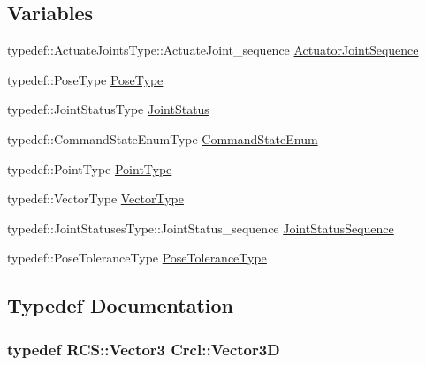 \subsection*{Variables}
\begin{DoxyCompactItemize}
\item 
typedef\-::\-Actuate\-Joints\-Type\-::\-Actuate\-Joint\-\_\-sequence \hyperlink{namespaceCrcl_af084766e8e2d38a135cc67ef54d9904d}{Actuator\-Joint\-Sequence}
\item 
typedef\-::\-Pose\-Type \hyperlink{namespaceCrcl_acc6c82b52280f4d0e74b82a92400956e}{Pose\-Type}
\item 
typedef\-::\-Joint\-Status\-Type \hyperlink{namespaceCrcl_a687707df3e92b0a1821bec2a0194039f}{Joint\-Status}
\item 
typedef\-::\-Command\-State\-Enum\-Type \hyperlink{namespaceCrcl_a5b3aa14f2f4ed63cc67ecba8eaab5c93}{Command\-State\-Enum}
\item 
typedef\-::\-Point\-Type \hyperlink{namespaceCrcl_a04f09d617642257f5938e52cee2feeef}{Point\-Type}
\item 
typedef\-::\-Vector\-Type \hyperlink{namespaceCrcl_ae868d4ece511d1485ed5d9118395aef8}{Vector\-Type}
\item 
typedef\-::\-Joint\-Statuses\-Type\-::\-Joint\-Status\-\_\-sequence \hyperlink{namespaceCrcl_a8e2d423195eeffb85b45b63f595f2825}{Joint\-Status\-Sequence}
\item 
typedef\-::\-Pose\-Tolerance\-Type \hyperlink{namespaceCrcl_ac805071e16341b82d4fa4e12b7f3ac6f}{Pose\-Tolerance\-Type}
\end{DoxyCompactItemize}


\subsection{Typedef Documentation}
\hypertarget{namespaceCrcl_a8d272fb6207c4f4195f4309c71d00a9c}{
\subsubsection[{Vector3\-D}]{\setlength{\rightskip}{0pt plus 5cm}typedef {\bf R\-C\-S\-::\-Vector3} {\bf Crcl\-::\-Vector3\-D}}}\label{namespaceCrcl_a8d272fb6207c4f4195f4309c71d00a9c}


